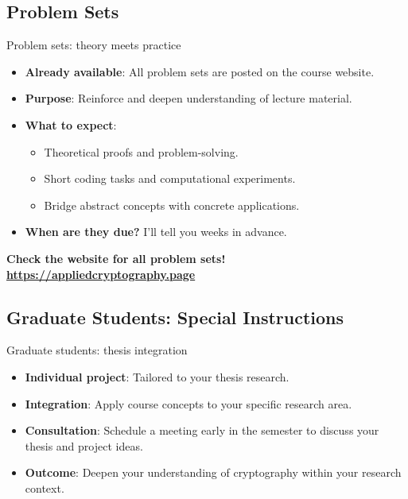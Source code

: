 \documentclass[aspectratio=169, lualatex, handout]{beamer}
\begin{document}
\subsection{Problem Sets}

\begin{frame}{Problem sets: theory meets practice}
	\begin{itemize}[<+->]
		\item \textbf{Already available}: All problem sets are posted on the course website.
		\item \textbf{Purpose}: Reinforce and deepen understanding of lecture material.
		\item \textbf{What to expect}:
		      \begin{itemize}
			      \item Theoretical proofs and problem-solving.
			      \item Short coding tasks and computational experiments.
			      \item Bridge abstract concepts with concrete applications.
		      \end{itemize}
		\item \textbf{When are they due?} I'll tell you weeks in advance.
	\end{itemize}
	\vspace{0.5cm}
	\begin{center}
		\Large\textcolor{cipherprimary}{\textbf{Check the website for all problem sets! \\ \url{https://appliedcryptography.page}}}
	\end{center}
\end{frame}

\subsection{Graduate Students: Special Instructions}

\begin{frame}{Graduate students: thesis integration}
	\vspace{0.1cm}
	\begin{itemize}[<+->]
		\item \textbf{Individual project}: Tailored to your thesis research.
		\item \textbf{Integration}: Apply course concepts to your specific research area.
		\item \textbf{Consultation}: Schedule a meeting early in the semester to discuss your thesis and project ideas.
		\item \textbf{Outcome}: Deepen your understanding of cryptography within your research context.
	\end{itemize}
\end{frame}
\end{document}
